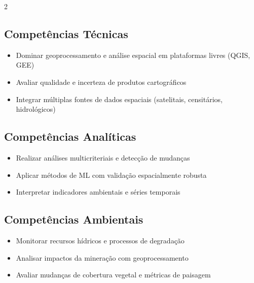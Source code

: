 \documentclass[11pt,a4paper]{article}
\begin{document}
\begin{multicols}{2}

\subsection*{Competências Técnicas}

\begin{itemize}

\item Dominar geoprocessamento e análise espacial em plataformas livres (QGIS, GEE)

\item Avaliar qualidade e incerteza de produtos cartográficos

\item Integrar múltiplas fontes de dados espaciais (satelitais, censitários, hidrológicos)

\end{itemize}

\subsection*{Competências Analíticas}

\begin{itemize}

\item Realizar análises multicriteriais e detecção de mudanças

\item Aplicar métodos de ML com validação espacialmente robusta

\item Interpretar indicadores ambientais e séries temporais

\end{itemize}

\columnbreak

\subsection*{Competências Ambientais}

\begin{itemize}

\item Monitorar recursos hídricos e processos de degradação

\item Analisar impactos da mineração com geoprocessamento

\item Avaliar mudanças de cobertura vegetal e métricas de paisagem


\end{itemize}
\end{multicols}
\end{document}
